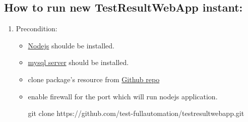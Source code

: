 \subsection{How to run new TestResultWebApp instant:}
\begin{enumerate}

\item Precondition:
   \begin{itemize}
   \item \href{https://nodejs.org/en/}{Nodejs} shoulde be installed.
   \item \href{https://dev.mysql.com/downloads/mysql/}{mysql server} should be 
         installed.
   \item clone package's resource from 
         \href{https://github.com/test-fullautomation/testresultwebapp}
         {Github repo}
   \item enable firewall for the port which will run nodejs application.
   \begin{robotlog}
   git clone https://github.com/test-fullautomation/testresultwebapp.git
   \end{robotlog}
      
   \end{itemize}


\end{enumerate}
